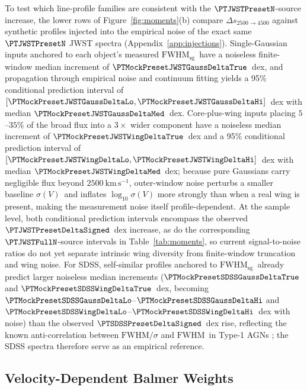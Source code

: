 \documentclass[twocolumn]{aastex631}
\newcommand{\kms}{\ensuremath{\mathrm{km\,s^{-1}}}}
\newcommand{\FWHM}{\ensuremath{\mathrm{FWHM}}}
\newcommand{\FWHMsg}{\ensuremath{\mathrm{FWHM}_{\mathrm{sg}}}}
\newcommand{\sigV}{\ensuremath{\sigma(V)}}
\begin{document}
To test which line-profile families are consistent with the $\PTJWSTPresetN$-source increase, the lower rows of Figure~\ref{fig:moments}(b) compare $\Delta s_{2500\to 4500}$ against synthetic profiles injected into the empirical noise of the exact same $\PTJWSTPresetN$ JWST spectra (Appendix~\ref{app:injections}). Single-Gaussian inputs anchored to each object's measured \FWHMsg\ have a noiseless finite-window median increment of $\PTMockPresetJWSTGaussDeltaTrue$~dex, and propagation through empirical noise and continuum fitting yields a 95\% conditional prediction interval of $[\PTMockPresetJWSTGaussDeltaLo, \PTMockPresetJWSTGaussDeltaHi]$~dex with median $\PTMockPresetJWSTGaussDeltaMed$~dex. Core-plus-wing inputs placing $5$--$35\%$ of the broad flux into a $3\times$ wider component have a noiseless median increment of $\PTMockPresetJWSTWingDeltaTrue$~dex and a 95\% conditional prediction interval of $[\PTMockPresetJWSTWingDeltaLo, \PTMockPresetJWSTWingDeltaHi]$~dex with median $\PTMockPresetJWSTWingDeltaMed$~dex; because pure Gaussians carry negligible flux beyond $2500~\kms$, outer-window noise perturbs a smaller baseline \sigV\ and inflates $\log_{10}\sigV$ more strongly than when a real wing is present, making the measurement noise itself profile-dependent. At the sample level, both conditional prediction intervals encompass the observed $\PTJWSTPresetDeltaSigned$~dex increase, as do the corresponding $\PTJWSTFullN$-source intervals in Table~\ref{tab:moments}, so current signal-to-noise ratios do not yet separate intrinsic wing diversity from finite-window truncation and wing noise. For SDSS, self-similar profiles anchored to \FWHMsg\ already predict larger noiseless median increments ($\PTMockPresetSDSSGaussDeltaTrue$ and $\PTMockPresetSDSSWingDeltaTrue$~dex, becoming $\PTMockPresetSDSSGaussDeltaLo$--$\PTMockPresetSDSSGaussDeltaHi$ and $\PTMockPresetSDSSWingDeltaLo$--$\PTMockPresetSDSSWingDeltaHi$~dex with noise) than the observed $\PTSDSSPresetDeltaSigned$~dex rise, reflecting the known anti-correlation between $\FWHM/\sigma$ and \FWHM\ in Type-1 AGNs \citep{Collin2006}; the SDSS spectra therefore serve as an empirical reference.

\subsection{Velocity-Dependent Balmer Weights}
\label{sec:res_balmer}
\end{document}
